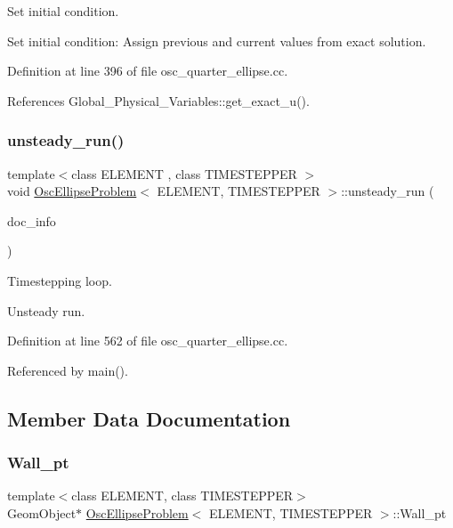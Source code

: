 Set initial condition. 

Set initial condition\+: Assign previous and current values from exact solution. 

Definition at line 396 of file osc\+\_\+quarter\+\_\+ellipse.\+cc.



References Global\+\_\+\+Physical\+\_\+\+Variables\+::get\+\_\+exact\+\_\+u().

\mbox{\label{classOscEllipseProblem_ad0d879edbbd8b09b61e802ab66ef98a3}} 
\subsubsection{\texorpdfstring{unsteady\+\_\+run()}{unsteady\_run()}}
{\footnotesize\ttfamily template$<$class E\+L\+E\+M\+E\+NT , class T\+I\+M\+E\+S\+T\+E\+P\+P\+ER $>$ \\
void \hyperlink{classOscEllipseProblem}{Osc\+Ellipse\+Problem}$<$ E\+L\+E\+M\+E\+NT, T\+I\+M\+E\+S\+T\+E\+P\+P\+ER $>$\+::unsteady\+\_\+run (\begin{DoxyParamCaption}\item[{Doc\+Info \&}]{doc\+\_\+info }\end{DoxyParamCaption})}



Timestepping loop. 

Unsteady run. 

Definition at line 562 of file osc\+\_\+quarter\+\_\+ellipse.\+cc.



Referenced by main().



\subsection{Member Data Documentation}
\mbox{\label{classOscEllipseProblem_a7d33f6345bf94cfe5165c4b9f2064ee6}} 
\subsubsection{\texorpdfstring{Wall\+\_\+pt}{Wall\_pt}}
{\footnotesize\ttfamily template$<$class E\+L\+E\+M\+E\+NT, class T\+I\+M\+E\+S\+T\+E\+P\+P\+ER$>$ \\
Geom\+Object$\ast$ \hyperlink{classOscEllipseProblem}{Osc\+Ellipse\+Problem}$<$ E\+L\+E\+M\+E\+NT, T\+I\+M\+E\+S\+T\+E\+P\+P\+ER $>$\+::Wall\+\_\+pt\hspace{0.3cm}{\ttfamily [private]}}



